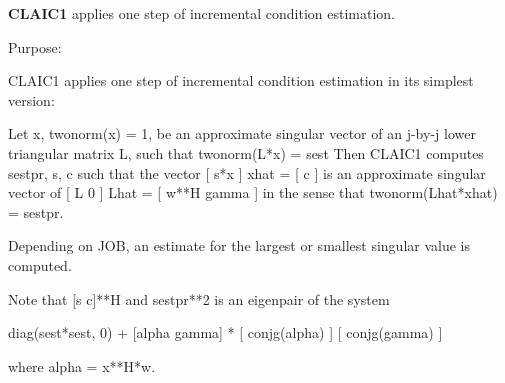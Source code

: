 {\bfseries C\+L\+A\+I\+C1} applies one step of incremental condition estimation. 

 \begin{DoxyParagraph}{Purpose\+: }
\begin{DoxyVerb} CLAIC1 applies one step of incremental condition estimation in
 its simplest version:

 Let x, twonorm(x) = 1, be an approximate singular vector of an j-by-j
 lower triangular matrix L, such that
          twonorm(L*x) = sest
 Then CLAIC1 computes sestpr, s, c such that
 the vector
                 [ s*x ]
          xhat = [  c  ]
 is an approximate singular vector of
                 [ L      0  ]
          Lhat = [ w**H gamma ]
 in the sense that
          twonorm(Lhat*xhat) = sestpr.

 Depending on JOB, an estimate for the largest or smallest singular
 value is computed.

 Note that [s c]**H and sestpr**2 is an eigenpair of the system

     diag(sest*sest, 0) + [alpha  gamma] * [ conjg(alpha) ]
                                           [ conjg(gamma) ]

 where  alpha =  x**H*w.\end{DoxyVerb}
 
\end{DoxyParagraph}

